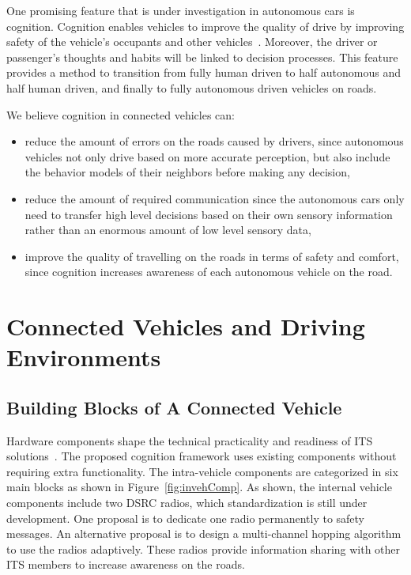\documentclass[journal, 11pt]{IEEEtran}
\begin{document}
One promising feature that is under investigation in autonomous cars is
cognition. Cognition enables vehicles to improve the quality of drive by
improving safety of the vehicle's occupants and other vehicles~\cite{cogcar}.
Moreover, the driver or passenger's thoughts and habits will be linked to
decision processes. This feature provides a method to transition from fully
human driven to half autonomous and half human driven, and finally to fully
autonomous driven vehicles on roads.

We believe cognition in connected vehicles can:

\begin{itemize}
  \item reduce the amount of errors on the roads caused by drivers, since
  autonomous vehicles not only drive based on more accurate perception, but also
  include the behavior models of their neighbors before making any decision,
  \item reduce the amount of required communication since the autonomous cars
  only need to transfer high level decisions based on their own sensory
  information rather than an enormous amount of low level sensory data,
  \item improve the quality of travelling on the roads in terms of safety and
  comfort, since cognition increases awareness of each autonomous vehicle on the
  road.
\end{itemize} 

\section{Connected Vehicles and Driving Environments}

\subsection{Building Blocks of A Connected Vehicle}

Hardware components shape the technical practicality and readiness of ITS
solutions~\cite{hardingNHTSA14}. The proposed cognition framework uses existing
components without requiring extra functionality. The intra-vehicle components
are categorized in six main blocks as shown in Figure~\ref{fig:invehComp}. As
shown, the internal vehicle components include two DSRC radios, which
standardization is still under development. One proposal is to dedicate one
radio permanently to safety messages. An alternative proposal is to design a
multi-channel hopping algorithm to use the radios adaptively. These radios
provide information sharing with other ITS members to increase awareness on the
roads.
\end{document}
